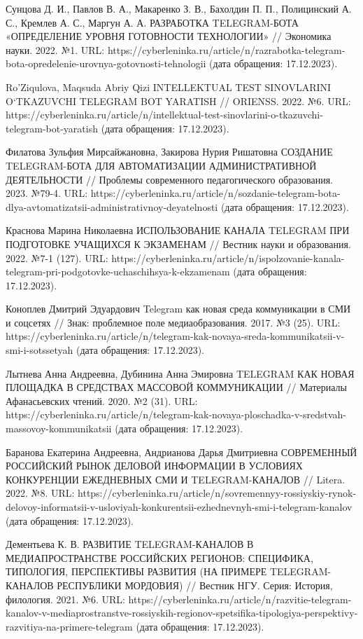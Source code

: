 \documentclass{article}
\begin{document}
Сунцова Д. И., Павлов В. А., Макаренко З. В., Бахолдин П. П., Полицинский А. С., Кремлев А. С., Маргун А. А. РАЗРАБОТКА TELEGRAM-БОТА «ОПРЕДЕЛЕНИЕ УРОВНЯ ГОТОВНОСТИ ТЕХНОЛОГИИ» // Экономика науки. 2022. №1. URL: https://cyberleninka.ru/article/n/razrabotka-telegram-bota-opredelenie-urovnya-gotovnosti-tehnologii (дата обращения: 17.12.2023).

Ro’Ziqulova, Maqsuda Abriy Qizi INTELLEKTUAL TEST SINOVLARINI O‘TKAZUVCHI TELEGRAM BOT YARATISH // ORIENSS. 2022. №6. URL: https://cyberleninka.ru/article/n/intellektual-test-sinovlarini-o-tkazuvchi-telegram-bot-yaratish (дата обращения: 17.12.2023).

Филатова Зульфия Мирсайжановна, Закирова Нурия Ришатовна СОЗДАНИЕ TELEGRAM-БОТА ДЛЯ АВТОМАТИЗАЦИИ АДМИНИСТРАТИВНОЙ ДЕЯТЕЛЬНОСТИ // Проблемы современного педагогического образования. 2023. №79-4. URL: https://cyberleninka.ru/article/n/sozdanie-telegram-bota-dlya-avtomatizatsii-administrativnoy-deyatelnosti (дата обращения: 17.12.2023).

Краснова Марина Николаевна ИСПОЛЬЗОВАНИЕ КАНАЛА TELEGRAM ПРИ ПОДГОТОВКЕ УЧАЩИХСЯ К ЭКЗАМЕНАМ // Вестник науки и образования. 2022. №7-1 (127). URL: https://cyberleninka.ru/article/n/ispolzovanie-kanala-telegram-pri-podgotovke-uchaschihsya-k-ekzamenam (дата обращения: 17.12.2023).

Коноплев Дмитрий Эдуардович Telegram как новая среда коммуникации в СМИ и соцсетях // Знак: проблемное поле медиаобразования. 2017. №3 (25). URL: https://cyberleninka.ru/article/n/telegram-kak-novaya-sreda-kommunikatsii-v-smi-i-sotssetyah (дата обращения: 17.12.2023).

Лытнева Анна Андреевна, Дубинина Анна Эмировна TELEGRAM КАК НОВАЯ ПЛОЩАДКА В СРЕДСТВАХ МАССОВОЙ КОММУНИКАЦИИ // Материалы Афанасьевских чтений. 2020. №2 (31). URL: https://cyberleninka.ru/article/n/telegram-kak-novaya-ploschadka-v-sredstvah-massovoy-kommunikatsii (дата обращения: 17.12.2023).

Баранова Екатерина Андреевна, Андрианова Дарья Дмитриевна СОВРЕМЕННЫЙ РОССИЙСКИЙ РЫНОК ДЕЛОВОЙ ИНФОРМАЦИИ В УСЛОВИЯХ КОНКУРЕНЦИИ ЕЖЕДНЕВНЫХ СМИ И TELEGRAM-КАНАЛОВ // Litera. 2022. №8. URL: https://cyberleninka.ru/article/n/sovremennyy-rossiyskiy-rynok-delovoy-informatsii-v-usloviyah-konkurentsii-ezhednevnyh-smi-i-telegram-kanalov (дата обращения: 17.12.2023).

Дементьева К. В. РАЗВИТИЕ TELEGRAM-КАНАЛОВ В МЕДИАПРОСТРАНСТВЕ РОССИЙСКИХ РЕГИОНОВ: СПЕЦИФИКА, ТИПОЛОГИЯ, ПЕРСПЕКТИВЫ РАЗВИТИЯ (НА ПРИМЕРЕ TELEGRAM-КАНАЛОВ РЕСПУБЛИКИ МОРДОВИЯ) // Вестник НГУ. Серия: История, филология. 2021. №6. URL: https://cyberleninka.ru/article/n/razvitie-telegram-kanalov-v-mediaprostranstve-rossiyskih-regionov-spetsifika-tipologiya-perspektivy-razvitiya-na-primere-telegram (дата обращения: 17.12.2023).
\end{document}
